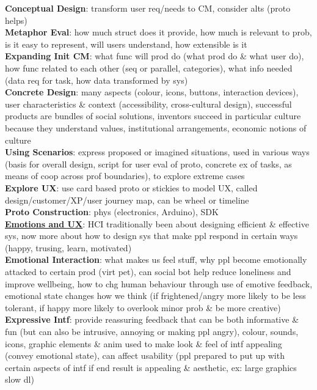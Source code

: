 \documentclass[a4paper]{article}
\begin{document}
\begin{multicols}{3}
        \textbf{Conceptual Design}: transform user req/needs to CM, consider alts (proto helps)\\
        \textbf{Metaphor Eval}: how much struct does it provide, how much is relevant to prob, is it easy to represent, will users understand, how extensible is it\\
        \textbf{Expanding Init CM}: what func will prod do (what prod do \& what user do), how func related to each other (seq or parallel, categories), what info needed (data req for task, how data transformed by sys)\\
        \textbf{Concrete Design}: many aspects (colour, icons, buttons, interaction devices), user characteristics \& context (accessibility, cross-cultural design), successful products are bundles of social solutions, inventors succeed in particular culture because they understand values, institutional arrangements, economic notions of culture\\
        \textbf{Using Scenarios}: express proposed or imagined situations, used in various ways (basis for overall design, script for user eval of proto, concrete ex of tasks, as means of coop across prof boundaries), to explore extreme cases\\
        \textbf{Explore UX}: use card based proto or stickies to model UX, called design/customer/XP/user journey map, can be wheel or timeline\\
        \textbf{Proto Construction}: phys (electronics, Arduino), SDK\\
        \underline{\textbf{Emotions and UX}}: HCI traditionally been about designing efficient \& effective sys, now more about how to design sys that make ppl respond in certain ways (happy, trusing, learn, motivated)\\
        \textbf{Emotional Interaction}: what makes us feel stuff, why ppl become emotionally attacked to certain prod (virt pet), can social bot help reduce loneliness and improve wellbeing, how to chg human behaviour through use of emotive feedback, emotional state changes how we think (if frightened/angry more likely to be less tolerant, if happy more likely to overlook minor prob \& be more creative)\\
        \textbf{Expressive Intf}: provide reassuring feedback that can be both informative \& fun (but can also be intrusive, annoying or making ppl angry), colour, sounds, icons, graphic elements \& anim used to make look \& feel of intf appealing (convey emotional state), can affect usability (ppl prepared to put up with certain aspects of intf if end result is appealing \& aesthetic, ex: large graphics slow dl)\\

\end{multicols}
\end{document}

